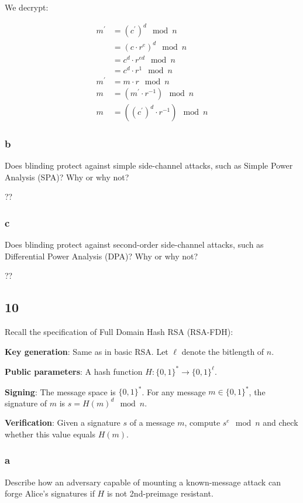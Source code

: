 \documentclass[11pt]{article}
\begin{document}
We decrypt:

\begin{align*}
  m^\prime &= (c^\prime)^d \mod n \\
  &= (c \cdot r^e)^d \mod n \\
  &= c^d \cdot r^{ed} \mod n \\
  &= c^d \cdot r^1 \mod n \\
  m^\prime &= m \cdot r \mod n \\
  m &= (m^\prime \cdot r^{-1}) \mod n \\
  m &= ((c^{\prime})^d \cdot r^{-1}) \mod n
\end{align*}

\subsubsection{b} Does blinding protect against simple side-channel attacks, such as Simple Power Analysis (SPA)? Why or why not?

??

\subsubsection{c} Does blinding protect against second-order side-channel attacks, such as Diﬀerential Power Analysis (DPA)? Why or why not?

??

\subsection{10} Recall the speciﬁcation of Full Domain Hash RSA (RSA-FDH):

\textbf{Key generation}: Same as in basic RSA. Let $\ell$ denote the bitlength of $n$.

\textbf{Public parameters}: A hash function $H : \{0, 1\}^* \to \{0, 1\}^\ell$.

\textbf{Signing}: The message space is $\{0, 1\}^*$. For any message $m \in \{0, 1\}^*$, the signature of $m$ is $s = H(m)^d \mod n$.

\textbf{Veriﬁcation}: Given a signature $s$ of a message $m$, compute $s^e \mod n$ and check whether this value
equals $H(m)$.

\subsubsection{a} Describe how an adversary capable of mounting a known-message attack can forge Alice's signatures if $H$ is not 2nd-preimage resistant.
\end{document}
